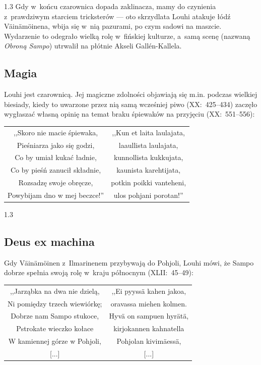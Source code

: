 \documentclass[11pt,a4paper,twoside]{report}
\begin{document}
\begin{spacing}{1.3}
Gdy w~końcu czarownica dopada zaklinacza, mamy do czynienia z~prawdziwym starciem tricksterów --- oto skrzydlata Louhi atakuje łódź Väinämöinena, wbija się w~nią pazurami, po czym sadowi na maszcie. Wydarzenie to odegrało wielką rolę w~fińskiej kulturze, a~samą scenę (nazwaną \emph{Obroną Sampo}) utrwalił na płótnie Akseli Gallén-Kallela.
\vspace*{0.5\baselineskip}
\subsection*{Magia}

Louhi jest czarownicą. Jej magiczne zdolności objawiają się m.in. podczas wielkiej biesiady, kiedy to uwarzone przez nią samą wcześniej piwo (XX:~425--434) zaczęło wygłaszać własną opinię na temat braku śpiewaków na przyjęciu (XX:~551--556):
\end{spacing}
\newpage
{\centering
\small
\begin{longtable}{c c}
,,Skoro nie macie śpiewaka, & ,,Kun et laita laulajata, \\
Pieśniarza jako się godzi, & laaullista laulajata, \\
Co by umiał kukać ładnie, & kunnollista kukkujata, \\
Co by pieśń zanucił składnie, & kaunista karehtijata, \\
Rozsadzę swoje obręcze, & potkin poikki vanteheni, \\
Powybijam dno w mej beczce!'' & ulos pohjani porotan!'' \\
\end{longtable}
}
\begin{spacing}{1.3}
\vspace*{0.5\baselineskip}
\subsection*{Deus ex machina}

Gdy Väinämöinen z~Ilmarinenem przybywają do Pohjoli, Louhi mówi, że Sampo dobrze spełnia swoją rolę w~kraju północnym (XLII:~45--49):
\end{spacing}
{\centering
\small
\begin{longtable}{c c}
,,Jarząbka na dwa nie dzielą, & ,,Ei pyyssä kahen jakoa, \\
Ni pomiędzy trzech wiewiórkę; & oravassa miehen kolmen. \\
Dobrze nam Sampo stukoce, & Hyvä on sampuen hyrätä, \\
Pstrokate wieczko kołace & kirjokannen kahnatella \\
W kamiennej górze w Pohjoli, & Pohjolan kivimäessä, \\
{[...]} & {[...]} \\
\end{longtable}
}
\end{document}
